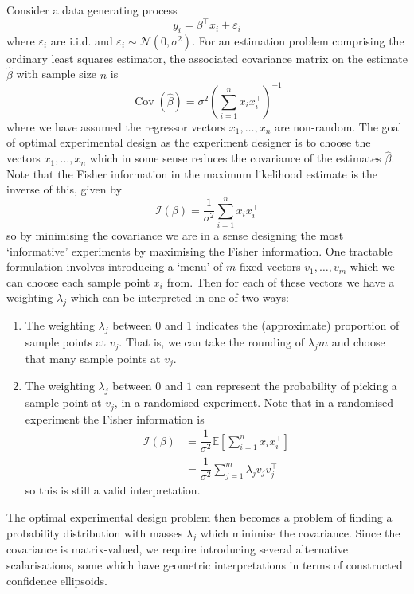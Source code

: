 \documentclass[11pt]{report} %
\begin{document}
Consider a data generating process
\begin{equation}
y_{i} = \beta^{\top}x_{i} + \varepsilon_{i}
\end{equation}
where $\varepsilon_{i}$ are i.i.d. and $\varepsilon_{i} \sim \mathcal{N}\left(0, \sigma^{2}\right)$. For an estimation problem comprising the ordinary least squares estimator, the associated covariance matrix on the estimate $\hat{\beta}$ with sample size $n$ is
\begin{equation}
\operatorname{Cov}\left(\hat{\beta}\right) = \sigma^{2}\left(\sum_{i = 1}^{n}x_{i}x_{i}^{\top}\right)^{-1}
\end{equation}
where we have assumed the regressor vectors $x_{1}, \dots, x_{n}$ are non-random. The goal of optimal experimental design as the experiment designer is to choose the vectors $x_{1}, \dots, x_{n}$ which in some sense reduces the covariance of the estimates $\hat{\beta}$. Note that the Fisher information in the maximum likelihood estimate is the inverse of this, given by
\begin{equation}
\mathcal{I}\left(\beta\right) = \dfrac{1}{\sigma^{2}}\sum_{i = 1}^{n}x_{i}x_{i}^{\top}
\end{equation}
so by minimising the covariance we are in a sense designing the most `informative' experiments by maximising the Fisher information. One tractable formulation involves introducing a `menu' of $m$ fixed vectors $v_{1}, \dots, v_{m}$ which we can choose each sample point $x_{i}$ from. Then for each of these vectors we have a weighting $\lambda_{j}$ which can be interpreted in one of two ways:
\begin{enumerate}
\item The weighting $\lambda_{j}$ between $0$ and $1$ indicates the (approximate) proportion of sample points at $v_{j}$. That is, we can take the rounding of $\lambda_{j}m$ and choose that many sample points at $v_{j}$.
\item The weighting $\lambda_{j}$ between $0$ and $1$ can represent the probability of picking a sample point at $v_{j}$, in a randomised experiment. Note that in a randomised experiment the Fisher information is
\begin{align}
\mathcal{I}\left(\beta\right) &= \dfrac{1}{\sigma^{2}}\mathbb{E}\left[\sum_{i = 1}^{n}x_{i}x_{i}^{\top}\right] \\
&= \dfrac{1}{\sigma^{2}}\sum_{j = 1}^{m}\lambda_{j}v_{j}v_{j}^{\top}
\end{align}
so this is still a valid interpretation.
\end{enumerate}
The optimal experimental design problem then becomes a problem of finding a probability distribution with masses $\lambda_{j}$ which minimise the covariance. Since the covariance is matrix-valued, we require introducing several alternative scalarisations, some which have geometric interpretations in terms of constructed confidence ellipsoids.
\end{document}
